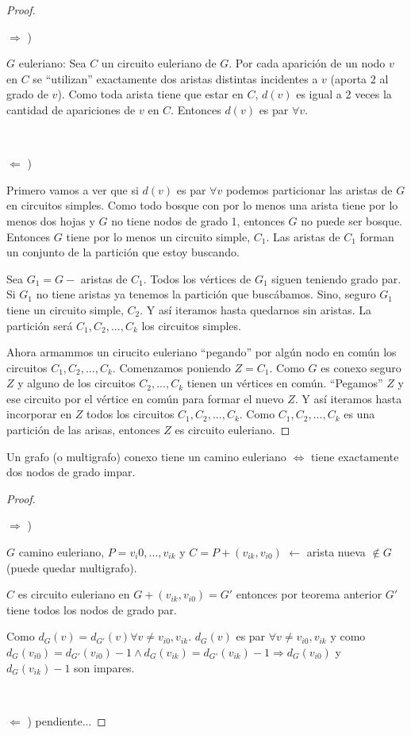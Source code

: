 \begin{proof}
~

$\Longrightarrow$ )

$G$ euleriano: Sea $C$ un circuito euleriano de $G$. Por cada aparición de un nodo $v$ en $C$ se ``utilizan'' exactamente dos aristas distintas incidentes a $v$ (aporta 2 al grado de $v$). Como toda arista tiene que estar en $C$, $d(v)$ es igual a 2 veces la cantidad de apariciones de $v$ en $C$. Entonces $d(v)$ es par $\forall v$.

~

$\Longleftarrow$ )

Primero vamos a ver que si $d(v)$ es par $\forall v$ podemos particionar las aristas de $G$ en circuitos simples. Como todo bosque con por lo menos una arista tiene por lo menos dos hojas y $G$ no tiene nodos de grado 1, entonces $G$ no puede ser bosque. Entonces $G$ tiene por lo menos un circuito simple, $C_1$. Las aristas de $C_1$ forman un conjunto de la partición que estoy buscando.

Sea $G_1 = G -$ aristas de $C_1$. Todos los vértices de $G_1$ siguen teniendo grado par. Si $G_1$ no tiene aristas ya tenemos la partición que buscábamos. Sino, seguro $G_1$ tiene un circuito simple, $C_2$. Y así iteramos hasta quedarnos sin aristas. La partición será $C_1, C_2, ..., C_k$ los circuitos simples. 

Ahora armammos un cirucito euleriano ``pegando'' por algún nodo en común los circuitos $C_1, C_2, ..., C_k$. Comenzamos poniendo $Z = C_1$. Como $G$ es conexo seguro $Z$ y alguno de los circuitos $C_2, ..., C_k$ tienen un vértices en común. ``Pegamos'' $Z$ y ese circuito por el vértice en común para formar el nuevo $Z$. Y así iteramos hasta incorporar en $Z$ todos los circuitos $C_1, C_2, ..., C_k$. Como $C_1, C_2, ..., C_k$ es una partición de las arisas, entonces $Z$ es circuito euleriano.
\end{proof}

\begin{teo}
    Un grafo (o multigrafo) conexo tiene un camino euleriano $\Longleftrightarrow$ tiene exactamente dos nodos de grado impar.
\end{teo}

\begin{proof}
~

$\Longrightarrow$ )

$G$ camino euleriano, $P = v_i0, ..., v_{ik}$ y $C = P + (v_{ik}, v_{i0})$ $\leftarrow$ arista nueva $\notin G$ (puede quedar multigrafo).

$C$ es circuito euleriano en $G + (v_{ik}, v_{i0}) = G'$ entonces por teorema anterior $G'$ tiene todos los nodos de grado par.

Como $d_G(v) = d_{G'}(v) \forall v \not= v_{i0}, v_{ik}$. $d_G(v)$ es par $\forall v \not= v_{i0}, v_{ik}$ y como $d_G(v_{i0}) = d_{G'}(v_{i0}) - 1 \land d_G(v_{ik}) = d_{G'}(v_{ik}) - 1 \Longrightarrow d_G(v_{i0})$ y $d_{G}(v_{ik}) - 1$ son impares.

~

$\Longleftarrow$ ) pendiente...
\end{proof}

